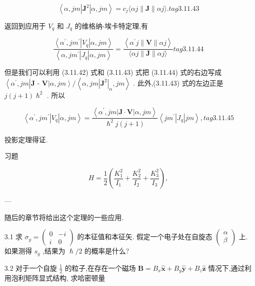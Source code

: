 $$
\left\langle {\alpha ,{jm}\left| {\mathbf{J}}^{2}\right| \alpha ,{jm}}\right\rangle = {c}_{j}\langle {\alpha j}\parallel \mathbf{J}\parallel {\alpha j}\rangle . tag{3.11.43}
$$

返回到应用于 ${V}_{q}$ 和 ${J}_{q}$ 的维格纳-埃卡特定理,有

$$
\frac{\left\langle {\alpha }^{\prime }, j{m}^{\prime }\left| {V}_{q}\right| \alpha, jm\right\rangle }{\left\langle \alpha, j{m}^{\prime }\left| {J}_{q}\right| \alpha, jm\right\rangle } = \frac{\left\langle {\alpha }^{\prime }j\parallel \mathbf{V}\parallel \alpha j\right\rangle }{\langle {\alpha j}\parallel \mathbf{J}\parallel {\alpha j}\rangle } tag{3.11.44}
$$

但是我们可以利用 (3.11.42) 式和 (3.11.43) 式把 (3.11.44) 式的右边写成 $\left\langle {{\alpha }^{\prime },{jm}}\right| \mathbf{J}$ - $\mathbf{V}\left| {\alpha ,{jm}}\right\rangle /\left\langle {\alpha ,{jm}{\left| {\mathbf{J}}^{2}\right| }_{\alpha },{jm}}\right\rangle$ . 此外,(3.11.43) 式的左边正是 $j\left( {j + 1}\right) {\hslash }^{2}$ . 所以

$$
\left\langle {{\alpha }^{\prime }, j{m}^{\prime }\left| {V}_{q}\right| \alpha ,{jm}}\right\rangle = \frac{\left\langle {\alpha }^{\prime }, jm\left| \mathbf{J} \cdot \mathbf{V}\right| \alpha, jm\right\rangle }{{\hslash }^{2}j\left( {j + 1}\right) }\left\langle {j{m}^{\prime }\left| {J}_{q}\right| {jm}}\right\rangle , tag{3.11.45}
$$

投影定理得证.

习题

$$
H = \frac{1}{2}\left( {\frac{{K}_{1}^{2}}{{I}_{1}} + \frac{{K}_{2}^{2}}{{I}_{2}} + \frac{{K}_{3}^{2}}{{I}_{3}}}\right) ,
$$

---

随后的章节将给出这个定理的一些应用.

3.1 求 ${\sigma }_{y} = \left( \begin{matrix} 0 & - i \\ i & 0 \end{matrix}\right)$ 的本征值和本征矢. 假定一个电子处在自旋态 $\left( \begin{array}{l} \alpha \\ \beta \end{array}\right)$ 上. 如果测得 ${s}_{y}$ ,结果为 $\hslash /2$ 的概率是什么?

3.2 对于一个自旋 $\frac{1}{2}$ 的粒子,在存在一个磁场 $\mathbf{B} = {B}_{x}\widehat{\mathbf{x}} + {B}_{y}\widehat{\mathbf{y}} + {B}_{z}\widehat{\mathbf{z}}$ 情况下,通过利用泡利矩阵显式结构, 求哈密顿量


